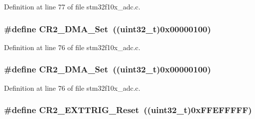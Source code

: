 Definition at line 77 of file stm32f10x\+\_\+adc.\+c.

\subsubsection[{\texorpdfstring{C\+R2\+\_\+\+D\+M\+A\+\_\+\+Set}{CR2_DMA_Set}}]{\setlength{\rightskip}{0pt plus 5cm}\#define C\+R2\+\_\+\+D\+M\+A\+\_\+\+Set~(({\bf uint32\+\_\+t})0x00000100)}\hypertarget{group___a_d_c___private___defines_ga7fa8ba27f5b249dd7cb0b6e53a25d6e2}{}\label{group___a_d_c___private___defines_ga7fa8ba27f5b249dd7cb0b6e53a25d6e2}


Definition at line 76 of file stm32f10x\+\_\+adc.\+c.

\subsubsection[{\texorpdfstring{C\+R2\+\_\+\+D\+M\+A\+\_\+\+Set}{CR2_DMA_Set}}]{\setlength{\rightskip}{0pt plus 5cm}\#define C\+R2\+\_\+\+D\+M\+A\+\_\+\+Set~(({\bf uint32\+\_\+t})0x00000100)}\hypertarget{group___a_d_c___private___defines_ga7fa8ba27f5b249dd7cb0b6e53a25d6e2}{}\label{group___a_d_c___private___defines_ga7fa8ba27f5b249dd7cb0b6e53a25d6e2}


Definition at line 76 of file stm32f10x\+\_\+adc.\+c.

\subsubsection[{\texorpdfstring{C\+R2\+\_\+\+E\+X\+T\+T\+R\+I\+G\+\_\+\+Reset}{CR2_EXTTRIG_Reset}}]{\setlength{\rightskip}{0pt plus 5cm}\#define C\+R2\+\_\+\+E\+X\+T\+T\+R\+I\+G\+\_\+\+Reset~(({\bf uint32\+\_\+t})0x\+F\+F\+E\+F\+F\+F\+F\+F)}\hypertarget{group___a_d_c___private___defines_ga8a96cb9aac77bab199f3dff54da230a6}{}\label{group___a_d_c___private___defines_ga8a96cb9aac77bab199f3dff54da230a6}



